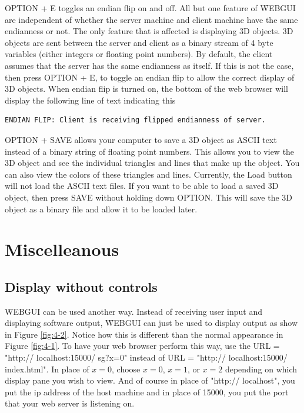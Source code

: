OPTION + E toggles an endian flip on and off. All but one feature of \f{WEBGUI} are independent of whether the
server machine and client machine have the same endianness or not. The only feature that is affected is displaying
3D objects. 3D objects are sent between the server and client as a binary stream of 4 byte variables (either integers
or floating point numbers). By default, the client assumes that the server has the same endianness as itself. If this 
is not the case, then press OPTION + E, to toggle an endian flip to allow the correct display of 3D objects. When endian
flip is turned on, the bottom of the web browser will display the following line of text indicating this
\begin{verbatim}
ENDIAN FLIP: Client is receiving flipped endianness of server.
\end{verbatim}

OPTION + SAVE allows your computer to save a 3D object as ASCII text instead of a binary string of floating point
numbers. This allows you to view the 3D object and see the individual triangles and lines that make up the 
object. You can also view the colors of these triangles and lines. Currently, the Load button will not load the ASCII text
files. If you want to be able to load a saved 3D object, then press SAVE without holding down OPTION. This will
save the 3D object as a binary file and allow it to be loaded later.

\section{Miscelleanous}
\subsection{Display without controls}
\label{sec:4-2}

\f{WEBGUI} can be used another way. Instead of receiving user input and displaying software output, \f{WEBGUI}
can just be used to display output as show in Figure \ref{fig:4-2}. Notice how this is different than the normal appearance
in Figure \ref{fig:4-1}. To have your web browser perform this way, use the URL = "http:// localhost:15000/ sg?x=0" instead of 
URL = "http:// localhost:15000/ index.html". In place of $x=0$, choose $x=0$, $x=1$, or $x=2$ depending on which display pane 
you wish to view. And of course in place of "http:// localhost", you put the ip address of the host machine and in place of 
15000, you put the port that your web server is listening on. 

